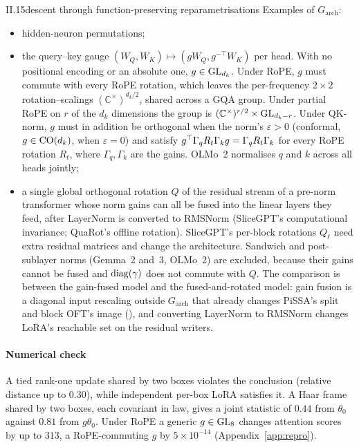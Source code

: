 \begin{observation}{II.15}{descent through function-preserving reparametrisations}
Examples of $G_{\mathrm{arch}}$:
\begin{itemize}
  \item hidden-neuron permutations;
  \item the query--key gauge $(W_Q,W_K)\mapsto(gW_Q,g^{-\top}W_K)$ per head. With no positional encoding or an absolute
    one, $g\in\mathrm{GL}_{d_k}$. Under RoPE, $g$ must commute with every RoPE rotation, which leaves the per-frequency $2\times2$
    rotation--scalings $(\mathbb C^\times)^{d_k/2}$, shared across a GQA group. Under partial RoPE on $r$ of the $d_k$
    dimensions the group is $(\mathbb C^\times)^{r/2}\times\mathrm{GL}_{d_k-r}$. Under QK-norm, $g$ must in addition be
    orthogonal when the norm's $\varepsilon>0$ (conformal, $g\in\mathrm{CO}(d_k)$, when $\varepsilon=0$) and satisfy
    $g^{\top}\Gamma_qR_t\Gamma_kg=\Gamma_qR_t\Gamma_k$ for every RoPE rotation $R_t$, where $\Gamma_q,\Gamma_k$ are the gains.
    OLMo~2 normalises $q$ and $k$ across all heads jointly;
  \item a single global orthogonal rotation $Q$ of the residual stream of a pre-norm transformer whose norm gains can all
    be fused into the linear layers they feed, after LayerNorm is converted to RMSNorm (SliceGPT's computational
    invariance; QuaRot's offline rotation). SliceGPT's per-block rotations $Q_\ell$ need extra residual matrices and
    change the architecture. Sandwich and post-sublayer norms (Gemma~2 and~3, OLMo~2) are excluded, because their gains
    cannot be fused and $\operatorname{diag}(\gamma)$ does not commute with $Q$. The comparison is between the gain-fused model and the
    fused-and-rotated model: gain fusion is a diagonal input rescaling outside $G_{\mathrm{arch}}$ that already changes
    PiSSA's split and block OFT's image (), and converting LayerNorm to RMSNorm changes LoRA's
    reachable set on the residual writers.
\end{itemize}
\end{observation}

\paragraph{Numerical check}
A tied rank-one update shared by two boxes violates the conclusion (relative distance up to $0.30$), while independent
per-box LoRA satisfies it. A Haar frame shared by two boxes, each covariant in law, gives a joint statistic of $0.44$ from
$\theta_0$ against $0.81$ from $g\theta_0$. Under RoPE a generic $g\in\mathrm{GL}_8$ changes attention scores by up to $313$, a
RoPE-commuting $g$ by $5\times10^{-14}$ (Appendix~\ref{app:repro}).

